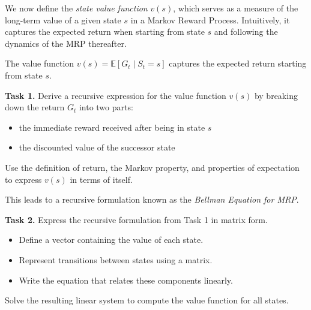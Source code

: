 \documentclass[12pt]{extreport}
\theoremstyle{definition}
\begin{document}
\bigskip

\noindent We now define the \textit{state value function} \( v(s) \), which serves as a measure of the long-term value of a given state \( s \) in a Markov Reward Process. Intuitively, it captures the expected return when starting from state \( s \) and following the dynamics of the MRP thereafter.

\begin{center}
\end{center}

\noindent The value function \( v(s) = \mathbb{E}[G_t \mid S_t = s] \) captures the expected return starting from state \( s \). 

\newpage

\bigskip

\noindent\textbf{Task 1.} Derive a recursive expression for the value function \( v(s) \) by breaking down the return \( G_t \) into two parts:
\begin{itemize}
  \item the immediate reward received after being in state \( s \)
  \item the discounted value of the successor state
\end{itemize}

\noindent Use the definition of return, the Markov property, and properties of expectation to express \( v(s) \) in terms of itself.

\medskip

\noindent This leads to a recursive formulation known as the \textit{Bellman Equation for MRP}.

\bigskip

\noindent\textbf{Task 2.} Express the recursive formulation from Task 1 in matrix form.

\begin{itemize}
  \item Define a vector containing the value of each state.
  \item Represent transitions between states using a matrix.
  \item Write the equation that relates these components linearly.
\end{itemize}

\noindent Solve the resulting linear system to compute the value function for all states.
\end{document}
